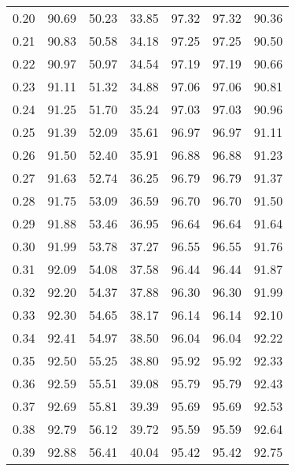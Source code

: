 \begin{tabular}{|c|c|c|c|c|c|c|}
      0.20 &     90.69 &     50.23 &      33.85 &   97.32 &      97.32 &         90.36 \\
      0.21 &     90.83 &     50.58 &      34.18 &   97.25 &      97.25 &         90.50 \\
      0.22 &     90.97 &     50.97 &      34.54 &   97.19 &      97.19 &         90.66 \\
      0.23 &     91.11 &     51.32 &      34.88 &   97.06 &      97.06 &         90.81 \\
      0.24 &     91.25 &     51.70 &      35.24 &   97.03 &      97.03 &         90.96 \\
      0.25 &     91.39 &     52.09 &      35.61 &   96.97 &      96.97 &         91.11 \\
      0.26 &     91.50 &     52.40 &      35.91 &   96.88 &      96.88 &         91.23 \\
      0.27 &     91.63 &     52.74 &      36.25 &   96.79 &      96.79 &         91.37 \\
      0.28 &     91.75 &     53.09 &      36.59 &   96.70 &      96.70 &         91.50 \\
      0.29 &     91.88 &     53.46 &      36.95 &   96.64 &      96.64 &         91.64 \\
      0.30 &     91.99 &     53.78 &      37.27 &   96.55 &      96.55 &         91.76 \\
      0.31 &     92.09 &     54.08 &      37.58 &   96.44 &      96.44 &         91.87 \\
      0.32 &     92.20 &     54.37 &      37.88 &   96.30 &      96.30 &         91.99 \\
      0.33 &     92.30 &     54.65 &      38.17 &   96.14 &      96.14 &         92.10 \\
      0.34 &     92.41 &     54.97 &      38.50 &   96.04 &      96.04 &         92.22 \\
      0.35 &     92.50 &     55.25 &      38.80 &   95.92 &      95.92 &         92.33 \\
      0.36 &     92.59 &     55.51 &      39.08 &   95.79 &      95.79 &         92.43 \\
      0.37 &     92.69 &     55.81 &      39.39 &   95.69 &      95.69 &         92.53 \\
      0.38 &     92.79 &     56.12 &      39.72 &   95.59 &      95.59 &         92.64 \\
      0.39 &     92.88 &     56.41 &      40.04 &   95.42 &      95.42 &         92.75 \\

\end{tabular}
